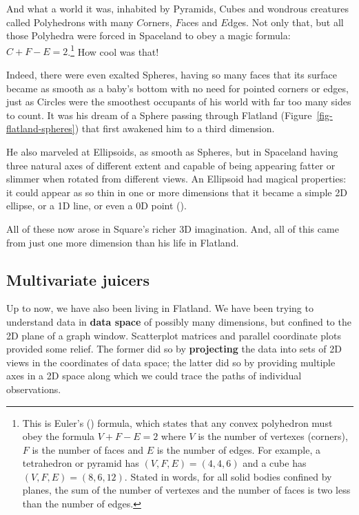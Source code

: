 \documentclass[
  letterpaper,
  10pt,
  krantz2]{krantz}
\begin{document}
And what a world it was, inhabited by Pyramids, Cubes and wondrous
creatures called Polyhedrons with many \(C\)orners, \(F\)aces and
\(E\)dges. Not only that, but all those Polyhedra were forced in
Spaceland to obey a magic formula: \(C + F - E = 2\).\footnote{This is
  Euler's () formula, which states that
  any convex polyhedron must obey the formula \(V + F - E = 2\) where
  \(V\) is the number of vertexes (corners), \(F\) is the number of
  faces and \(E\) is the number of edges. For example, a tetrahedron or
  pyramid has \((V, F, E) = (4, 4, 6)\) and a cube has
  \((V, F, E) = (8, 6, 12)\). Stated in words, for all solid bodies
  confined by planes, the sum of the number of vertexes and the number
  of faces is two less than the number of edges.} How cool was that!

Indeed, there were even exalted Spheres, having so many faces that its
surface became as smooth as a baby's bottom with no need for pointed
corners or edges, just as Circles were the smoothest occupants of his
world with far too many sides to count. It was his dream of a Sphere
passing through Flatland (Figure~\ref{fig-flatland-spheres}) that first
awakened him to a third dimension.

He also marveled at Ellipsoids, as smooth as Spheres, but in Spaceland
having three natural axes of different extent and capable of being
appearing fatter or slimmer when rotated from different views. An
Ellipsoid had magical properties: it could appear as so thin in one or
more dimensions that it became a simple 2D ellipse, or a 1D line, or
even a 0D point ().

All of these now arose in Square's richer 3D imagination. And, all of
this came from just one more dimension than his life in Flatland.

\subsection{Multivariate juicers}\label{multivariate-juicers}

Up to now, we have also been living in Flatland. We have been trying to
understand data in \textbf{data space} of possibly many dimensions, but
confined to the 2D plane of a graph window. Scatterplot matrices and
parallel coordinate plots provided some relief. The former did so by
\textbf{projecting} the data into sets of 2D views in the coordinates of
data space; the latter did so by providing multiple axes in a 2D space
along which we could trace the paths of individual observations.
\end{document}
